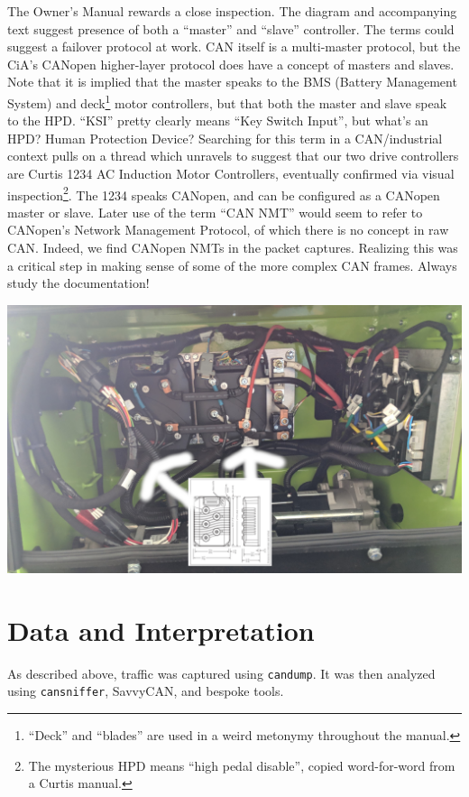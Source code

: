 \documentclass[letterpaper,10pt]{article}
\begin{document}
The Owner's Manual rewards a close inspection. The diagram and accompanying
text suggest presence of both a ``master'' and ``slave'' controller. The terms
could suggest a failover protocol at work. CAN itself is a multi-master
protocol, but the CiA's CANopen\parencite{cia301} higher-layer protocol does
have a concept of masters and slaves. Note that it is implied that the master
speaks to the BMS (Battery Management System) and deck\footnote{``Deck'' and
``blades'' are used in a weird metonymy throughout the manual.} motor
controllers, but that both the master and slave speak to the HPD. ``KSI''
pretty clearly means ``Key Switch Input'', but what's an HPD? Human
Protection Device? Searching for this term in a CAN/industrial context pulls
on a thread which unravels to suggest that our two drive controllers are Curtis
1234\parencite{curtis1234} AC Induction Motor Controllers, eventually confirmed
via visual inspection\footnote{The mysterious HPD means ``high pedal disable'',
copied word-for-word from a Curtis manual.}. The 1234 speaks CANopen, and can
be configured as a CANopen master or slave. Later use of the term ``CAN NMT''
would seem to refer to CANopen's Network Management Protocol, of which there is
no concept in raw CAN. Indeed, we find CANopen NMTs in the packet captures.
Realizing this was a critical step in making sense of some of the more complex
CAN frames. Always study the documentation!
\begin{center}
\includegraphics[width=.75\linewidth]{greenzie-electrics.jpg}
\end{center}

\section{Data and Interpretation}
As described above, traffic was captured using \texttt{candump}. It was then
analyzed using \texttt{cansniffer}, SavvyCAN\parencite{savvycan}, and bespoke
tools.
\end{document}
